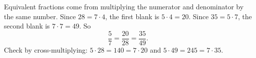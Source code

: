 Equivalent fractions come from multiplying the numerator and denominator by the same number. Since $28=7\cdot4$, the first blank is $5\cdot4=20$. Since $35=5\cdot7$, the second blank is $7\cdot7=49$. So
\[
\dfrac{5}{7}=\dfrac{\boxed{20}}{28}=\dfrac{35}{\boxed{49}} .
\]
Check by cross-multiplying: $5\cdot28=140=7\cdot20$ and $5\cdot49=245=7\cdot35$.
